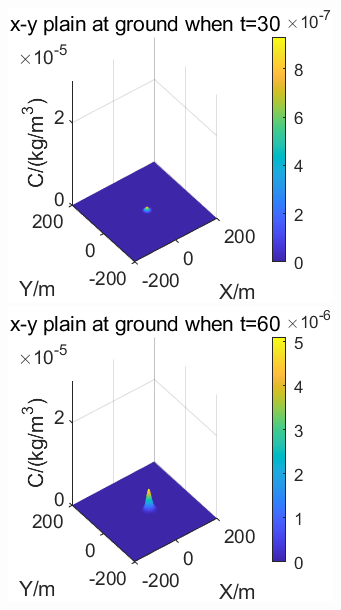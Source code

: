 \documentclass{article}
\begin{document}
	\begin{figure}[htbp]
		\begin{minipage}{0.33\textwidth}
			\includegraphics[width=\textwidth]{pics/v=0.5,t=30.png}
		\end{minipage}
		\begin{minipage}{0.33\textwidth}
			\includegraphics[width=\textwidth]{pics/v=0.5,t=60.png}

\end{minipage}
\end{figure}
\end{document}
